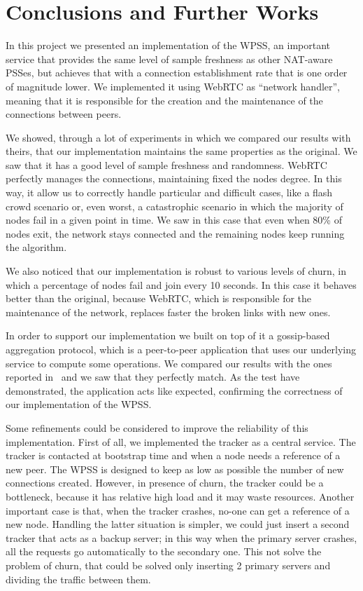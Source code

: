 
\chapter{Conclusions and Further Works}
\label{cha:conclusions}
In this project we presented an implementation of the WPSS, an important service that provides the same level of sample freshness as other NAT-aware PSSes, but achieves that with a connection establishment rate that is one order of magnitude lower. We implemented it using WebRTC as ``network handler'', meaning that it is responsible for the creation and the maintenance of the connections between peers.

We showed, through a lot of experiments in which we compared our results with theirs, that our implementation maintains the same properties as the original. We saw that it has a good level of sample freshness and randomness. WebRTC perfectly manages the connections, maintaining fixed the nodes degree. In this way, it allow us to correctly handle particular and difficult cases, like a flash crowd scenario or, even worst, a catastrophic scenario in which the majority of nodes fail in a given point in time. We saw in this case that even when 80\% of nodes exit, the network stays connected and the remaining nodes keep running the algorithm. 

We also noticed that our implementation is robust to various levels of churn, in which a percentage of nodes fail and join every 10 seconds. In this case it behaves better than the original, because WebRTC, which is responsible for the maintenance of the network, replaces faster the broken links with new ones. 

In order to support our implementation we built on top of it a gossip-based aggregation protocol, which is a peer-to-peer application that uses our underlying service to compute some operations. We compared our results with the ones reported in~\cite{aggregation} and we saw that they perfectly match. As the test have demonstrated, the application acts like expected, confirming the correctness of our implementation of the WPSS. 

Some refinements could be considered to improve the reliability of this implementation. First of all, we implemented the tracker as a central service. The tracker is contacted at bootstrap time and when a node needs a reference of a new peer. The WPSS is designed to keep as low as possible the number of new connections created. However, in presence of churn, the tracker could be a bottleneck, because it has relative high load and it may waste resources. Another important case is that, when the tracker crashes, no-one can get a reference of a new node. Handling the latter situation is simpler, we could just insert a second tracker that acts as a backup server; in this way when the primary server crashes, all the requests go automatically to the secondary one. This not solve the problem of churn, that could be solved only inserting 2 primary servers and dividing the traffic between them. 

